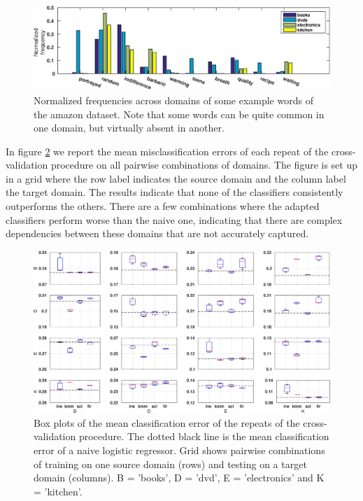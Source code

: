 \documentclass[twoside,11pt]{article}
\begin{document}
\begin{figure}[ht]
\centering
\includegraphics[width=.9\textwidth]{images/eg_amazon.eps}
\caption{Normalized frequencies across domains of some example words of the amazon dataset. Note that some words can be quite common in one domain, but virtually absent in another.}
\label{eg_amazon}
\end{figure}

In figure \ref{err_amazon} we report the mean misclassification errors of each repeat of the cross-validation procedure on all pairwise combinations of domains. The figure is set up in a grid where the row label indicates the source domain and the column label the target domain. The results indicate that none of the classifiers consistently outperforms the others. There are a few combinations where the adapted classifiers perform worse than the naive one, indicating that there are complex dependencies between these domains that are not accurately captured.

\begin{figure}[ht]
	\centering
	\includegraphics[width=.9\textwidth]{images/err_amazon_box.eps} 	
	\caption{Box plots of the mean classification error of the repeats of the cross-validation procedure. The dotted black line is the mean classification error of a naive logistic regressor. Grid shows pairwise combinations of training on one source domain (rows) and testing on a target domain (columns). B = 'books', D = 'dvd', E = 'electronics' and K = 'kitchen'.}
	\label{err_amazon}
\end{figure}
\end{document}
